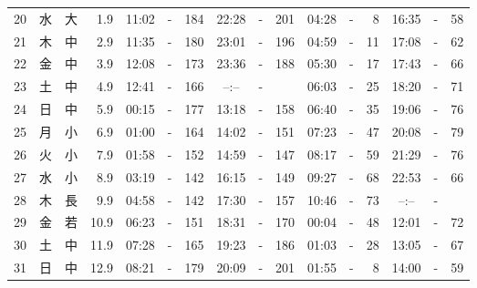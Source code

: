 \documentclass[12pt.a4j]{jsarticle}
\begin{document}
\begin{center}
\begin{table}[ht]
\begin{tabular}{|rc|cr|ccrccr|ccrccr|}
20 & 水 & 大 &  1.9 &  11:02 &-& 184  &  22:28 &-& 201  &   04:28 &-&   8  &   16:35 &-&  58  \\
21 & 木 & 中 &  2.9 &  11:35 &-& 180  &  23:01 &-& 196  &   04:59 &-&  11  &   17:08 &-&  62  \\
22 & 金 & 中 &  3.9 &  12:08 &-& 173  &  23:36 &-& 188  &   05:30 &-&  17  &   17:43 &-&  66  \\
23 & 土 & 中 &  4.9 &  12:41 &-& 166  &  --:-- &-&     &   06:03 &-&  25  &   18:20 &-&  71  \\
24 & 日 & 中 &  5.9 &  00:15 &-& 177  &  13:18 &-& 158  &   06:40 &-&  35  &   19:06 &-&  76  \\
25 & 月 & 小 &  6.9 &  01:00 &-& 164  &  14:02 &-& 151  &   07:23 &-&  47  &   20:08 &-&  79  \\
26 & 火 & 小 &  7.9 &  01:58 &-& 152  &  14:59 &-& 147  &   08:17 &-&  59  &   21:29 &-&  76  \\
27 & 水 & 小 &  8.9 &  03:19 &-& 142  &  16:15 &-& 149  &   09:27 &-&  68  &   22:53 &-&  66  \\
28 & 木 & 長 &  9.9 &  04:58 &-& 142  &  17:30 &-& 157  &   10:46 &-&  73  &   --:-- &-&     \\
29 & 金 & 若 & 10.9 &  06:23 &-& 151  &  18:31 &-& 170  &   00:04 &-&  48  &   12:01 &-&  72  \\
30 & 土 & 中 & 11.9 &  07:28 &-& 165  &  19:23 &-& 186  &   01:03 &-&  28  &   13:05 &-&  67  \\
31 & 日 & 中 & 12.9 &  08:21 &-& 179  &  20:09 &-& 201  &   01:55 &-&   8  &   14:00 &-&  59  \\
   \hline
   \end{tabular}
\end{table}
\newpage
\end{center}
\end{document}
